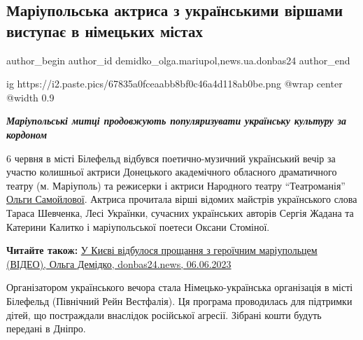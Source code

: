  
 
 
 
 
 
\subsection{Маріупольська актриса з українськими віршами виступає в німецьких містах}
\label{sec:08_06_2023.stz.news.ua.donbas24.1.mariupol_aktrisa_virshi_nimecchyna_vystupy_olga_samojlova}
 
\ifcmt
 author_begin
   author_id demidko_olga.mariupol,news.ua.donbas24
 author_end
\fi

\ifcmt
  ig https://i2.paste.pics/67835a0fceaabb8bf0c46a4d118ab0be.png
  @wrap center
  @width 0.9
\fi

\begin{center}
  \em\color{blue}\bfseries\Large
Маріупольські митці продовжують популяризувати українську культуру за
кордоном 
\end{center}

6 червня в місті Білефельд відбувся поетично-музичний український вечір за
участю колишньої актриси Донецького академічного обласного драматичного театру
(м. Маріуполь) та режисерки і актриси Народного театру \enquote{Театроманія}
\href{https://www.facebook.com/profile.php?id=100001752890543}{Ольги
Самойлової}. Актриса прочитала вірші відомих майстрів українського слова Тараса
Шевченка, Лесі Українки, сучасних українських авторів Сергія Жадана та Катерини
Калитко і маріупольської поетеси Оксани Стоміної.

\textbf{Читайте також:} \href{https://archive.org/details/06_06_2023.demidko_olga.donbas24.u_kievi_vidbulos_proschannja_iz_geroichnym_mariupolcem}{%
У Києві відбулося прощання з героїчним маріупольцем (ВІДЕО), Ольга Демідко, donbas24.news, 06.06.2023}

Організатором українського вечора стала Німецько-українська організація в місті
Білефельд (Північний Рейн Вестфалія). Ця програма проводилась для підтримки
дітей, що постраждали внаслідок російської агресії. Зібрані кошти будуть
передані в Дніпро. 


